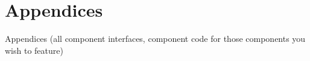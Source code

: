 \documentclass[final]{article}
\begin{document}
\section{Appendices}
Appendices (all component interfaces, component code for those components you wish to feature)
\end{document}
